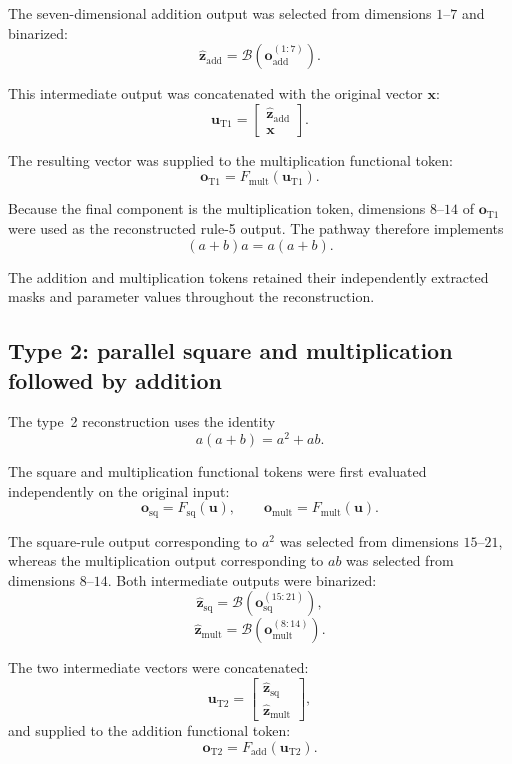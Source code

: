 \documentclass{article}
\begin{document}
The seven-dimensional addition output was selected from dimensions $1$--$7$ and binarized:
\[
\hat{\mathbf{z}}_{\mathrm{add}}
=
\mathcal{B}
\left(
\mathbf{o}_{\mathrm{add}}^{(1:7)}
\right).
\]

This intermediate output was concatenated with the original vector $\mathbf{x}$:
\[
\mathbf{u}_{\mathrm{T1}}
=
\begin{bmatrix}
\hat{\mathbf{z}}_{\mathrm{add}}\\
\mathbf{x}
\end{bmatrix}.
\]

The resulting vector was supplied to the multiplication functional token:
\[
\mathbf{o}_{\mathrm{T1}}
=
F_{\mathrm{mult}}
\left(
\mathbf{u}_{\mathrm{T1}}
\right).
\]

Because the final component is the multiplication token, dimensions $8$--$14$ of $\mathbf{o}_{\mathrm{T1}}$ were used as the reconstructed rule-5 output. The pathway therefore implements
\[
(a+b)a=a(a+b).
\]

The addition and multiplication tokens retained their independently extracted masks and parameter values throughout the reconstruction.

\subsection{Type 2: parallel square and multiplication followed by addition}

The type~2 reconstruction uses the identity
\[
a(a+b)=a^2+ab.
\]

The square and multiplication functional tokens were first evaluated independently on the original input:
\[
\mathbf{o}_{\mathrm{sq}}
=
F_{\mathrm{sq}}(\mathbf{u}),
\qquad
\mathbf{o}_{\mathrm{mult}}
=
F_{\mathrm{mult}}(\mathbf{u}).
\]

The square-rule output corresponding to $a^2$ was selected from dimensions $15$--$21$, whereas the multiplication output corresponding to $ab$ was selected from dimensions $8$--$14$. Both intermediate outputs were binarized:
\[
\hat{\mathbf{z}}_{\mathrm{sq}}
=
\mathcal{B}
\left(
\mathbf{o}_{\mathrm{sq}}^{(15:21)}
\right),
\]
\[
\hat{\mathbf{z}}_{\mathrm{mult}}
=
\mathcal{B}
\left(
\mathbf{o}_{\mathrm{mult}}^{(8:14)}
\right).
\]

The two intermediate vectors were concatenated:
\[
\mathbf{u}_{\mathrm{T2}}
=
\begin{bmatrix}
\hat{\mathbf{z}}_{\mathrm{sq}}\\
\hat{\mathbf{z}}_{\mathrm{mult}}
\end{bmatrix},
\]
and supplied to the addition functional token:
\[
\mathbf{o}_{\mathrm{T2}}
=
F_{\mathrm{add}}
\left(
\mathbf{u}_{\mathrm{T2}}
\right).
\]
\end{document}
